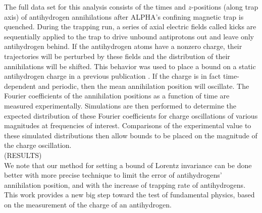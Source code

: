 \documentclass[superscriptaddress,aps,prb,11pt]{revtex4-1}
\begin{document}
The full data set for this analysis consists of the times and $z$-positions (along trap axis) of antihydrogen annihilations after ALPHA's confining magnetic trap is quenched.  During the trapping run, a series of axial electric fields called kicks are sequentially applied to the trap to drive unbound antiprotons out and leave only antihydrogen behind. If the antihydrogen atoms have a nonzero charge, their trajectories will be perturbed by these fields and the distribution of their annihilations will be shifted.  This behavior was used to place a bound on a static antihydrogen charge in a previous publication \citep{amol:14a}.  If the charge is in fact time-dependent and periodic, then the mean annihilation position will oscillate.  The Fourier coefficients of the annihilation positions as a function of time are measured experimentally.  Simulations are then performed to determine the expected distribution of these Fourier coefficients for charge oscillations of various magnitudes at frequencies of interest.  Comparisons of the experimental value to these simulated distributions then allow bounds to be placed on the magnitude of the charge oscillation.
\\

\noindent
(RESULTS)
\\

We note that our method for setting a bound of Lorentz invariance can be done better with more precise technique to limit the error of antihydrogens' annihilation position, and with the increase of trapping rate of antihydrogens. This work provides a new big step toward the test of fundamental physics, based on the measurement of the charge of an antihydrogen.
\end{document}
